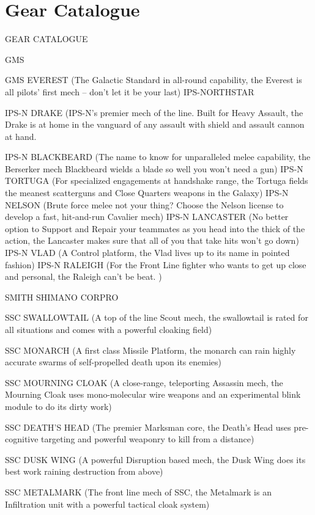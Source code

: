 \section{Gear Catalogue}
 GEAR CATALOGUE

                                                GMS

GMS EVEREST (The Galactic Standard in all-round capability, the Everest is all pilots’ first mech
-- don’t let it be your last)
                                    IPS-NORTHSTAR

IPS-N DRAKE (IPS-N’s premier mech of the line. Built for Heavy Assault, the Drake is at home
in the vanguard of any assault with shield and assault cannon at hand.

IPS-N BLACKBEARD (The name to know for unparalleled melee capability, the Berserker mech
Blackbeard wields a blade so well you won’t need a gun)
IPS-N TORTUGA (For specialized engagements at handshake range, the Tortuga fields the
meanest scatterguns and Close Quarters weapons in the Galaxy)
IPS-N NELSON (Brute force melee not your thing? Choose the Nelson license to develop a fast,
hit-and-run Cavalier mech)
IPS-N LANCASTER (No better option to Support and Repair your teammates as you head into
the thick of the action, the Lancaster makes sure that all of you that take hits won’t go down)
IPS-N VLAD (A Control platform, the Vlad lives up to its name in pointed fashion)
IPS-N RALEIGH (For the Front Line fighter who wants to get up close and personal, the Raleigh
can’t be beat. )

                           SMITH SHIMANO CORPRO

SSC SWALLOWTAIL (A top of the line Scout mech, the swallowtail is rated for all situations and
comes with a powerful cloaking field)

SSC MONARCH (A first class Missile Platform, the monarch can rain highly accurate swarms of
self-propelled death upon its enemies)

SSC MOURNING CLOAK (A close-range, teleporting Assassin mech, the Mourning Cloak uses
mono-molecular wire weapons and an experimental blink module to do its dirty work)

SSC DEATH’S HEAD (The premier Marksman core, the Death’s Head uses pre-cognitive
targeting and powerful weaponry to kill from a distance)

SSC DUSK WING (A powerful Disruption based mech, the Dusk Wing does its best work
raining destruction from above)

SSC METALMARK (The front line mech of SSC, the Metalmark is an Infiltration unit with a
powerful tactical cloak system)

